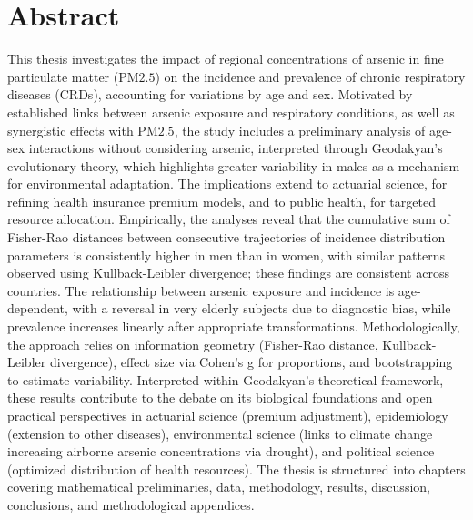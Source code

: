 \section{Abstract}

This thesis investigates the impact of regional concentrations of arsenic in fine particulate matter (PM${2.5}$) on the incidence and prevalence of chronic respiratory diseases (CRDs), accounting for variations by age and sex. Motivated by established links between arsenic exposure and respiratory conditions, as well as synergistic effects with PM${2.5}$, the study includes a preliminary analysis of age-sex interactions without considering arsenic, interpreted through Geodakyan’s evolutionary theory, which highlights greater variability in males as a mechanism for environmental adaptation.
The implications extend to actuarial science, for refining health insurance premium models, and to public health, for targeted resource allocation.
Empirically, the analyses reveal that the cumulative sum of Fisher-Rao distances between consecutive trajectories of incidence distribution parameters is consistently higher in men than in women, with similar patterns observed using Kullback-Leibler divergence; these findings are consistent across countries. The relationship between arsenic exposure and incidence is age-dependent, with a reversal in very elderly subjects due to diagnostic bias, while prevalence increases linearly after appropriate transformations. Methodologically, the approach relies on information geometry (Fisher-Rao distance, Kullback-Leibler divergence), effect size via Cohen’s g for proportions, and bootstrapping to estimate variability.
Interpreted within Geodakyan’s theoretical framework, these results contribute to the debate on its biological foundations and open practical perspectives in actuarial science (premium adjustment), epidemiology (extension to other diseases), environmental science (links to climate change increasing airborne arsenic concentrations via drought), and political science (optimized distribution of health resources). The thesis is structured into chapters covering mathematical preliminaries, data, methodology, results, discussion, conclusions, and methodological appendices.